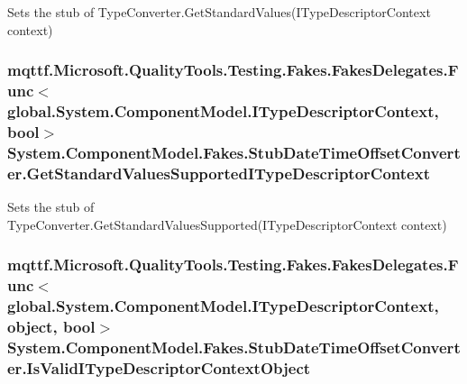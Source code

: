 Sets the stub of Type\-Converter.\-Get\-Standard\-Values(\-I\-Type\-Descriptor\-Context context)

\hypertarget{class_system_1_1_component_model_1_1_fakes_1_1_stub_date_time_offset_converter_aeb204a7bad75c9cf528e1204e635c136}{
\subsubsection[{Get\-Standard\-Values\-Supported\-I\-Type\-Descriptor\-Context}]{\setlength{\rightskip}{0pt plus 5cm}mqttf.\-Microsoft.\-Quality\-Tools.\-Testing.\-Fakes.\-Fakes\-Delegates.\-Func$<$global.\-System.\-Component\-Model.\-I\-Type\-Descriptor\-Context, bool$>$ System.\-Component\-Model.\-Fakes.\-Stub\-Date\-Time\-Offset\-Converter.\-Get\-Standard\-Values\-Supported\-I\-Type\-Descriptor\-Context}}\label{class_system_1_1_component_model_1_1_fakes_1_1_stub_date_time_offset_converter_aeb204a7bad75c9cf528e1204e635c136}


Sets the stub of Type\-Converter.\-Get\-Standard\-Values\-Supported(\-I\-Type\-Descriptor\-Context context)

\hypertarget{class_system_1_1_component_model_1_1_fakes_1_1_stub_date_time_offset_converter_a1312ce212dbaddf7338409836a473bab}{
\subsubsection[{Is\-Valid\-I\-Type\-Descriptor\-Context\-Object}]{\setlength{\rightskip}{0pt plus 5cm}mqttf.\-Microsoft.\-Quality\-Tools.\-Testing.\-Fakes.\-Fakes\-Delegates.\-Func$<$global.\-System.\-Component\-Model.\-I\-Type\-Descriptor\-Context, object, bool$>$ System.\-Component\-Model.\-Fakes.\-Stub\-Date\-Time\-Offset\-Converter.\-Is\-Valid\-I\-Type\-Descriptor\-Context\-Object}}\label{class_system_1_1_component_model_1_1_fakes_1_1_stub_date_time_offset_converter_a1312ce212dbaddf7338409836a473bab}


